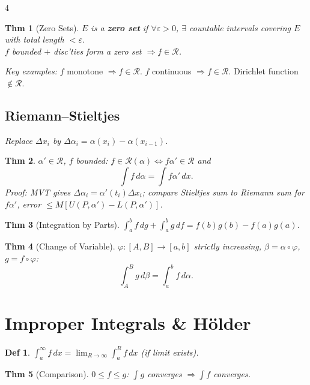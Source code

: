 \documentclass[9pt,landscape]{extarticle}
\newcommand{\eps}{\varepsilon}
\theoremstyle{compact}
\newtheorem*{thm}{Thm}
\newtheorem*{defn}{Def}
\begin{document}
\begin{multicols}{4}
\begin{thm}[Zero Sets]
$E$ is a \textbf{zero set} if $\forall\eps>0$, $\exists$ countable intervals covering $E$ with total length $< \eps$.\\
$f$ bounded $+$ disc'ties form a zero set $\Rightarrow f \in \mathscr{R}$.
\end{thm}

\textit{Key examples:} $f$ monotone $\Rightarrow f \in \mathscr{R}$. $f$ continuous $\Rightarrow f \in \mathscr{R}$. Dirichlet function $\notin \mathscr{R}$.

\subsection{Riemann--Stieltjes}
\textit{Replace $\Delta x_i$ by $\Delta\alpha_i = \alpha(x_i)-\alpha(x_{i-1})$.}

\begin{thm}
$\alpha' \in \mathscr{R}$, $f$ bounded: $f\in\mathscr{R}(\alpha) \Leftrightarrow f\alpha'\in\mathscr{R}$ and
$${\textstyle\int} f\,d\alpha = {\textstyle\int} f\alpha'\,dx.$$
\textit{Proof:} MVT gives $\Delta\alpha_i = \alpha'(t_i)\Delta x_i$; compare Stieltjes sum to Riemann sum for $f\alpha'$, error $\leq M[U(P,\alpha')-L(P,\alpha')]$.
\end{thm}

\begin{thm}[Integration by Parts]
$\displaystyle\int_a^b f\,dg + \int_a^b g\,df = f(b)g(b)-f(a)g(a)$.
\end{thm}

\begin{thm}[Change of Variable]
$\varphi:[A,B]\to[a,b]$ strictly increasing, $\beta = \alpha\circ\varphi$, $g = f\circ\varphi$:
$${\textstyle\int_A^B} g\,d\beta = {\textstyle\int_a^b} f\,d\alpha.$$
\end{thm}

\section{Improper Integrals \& H\"{o}lder}

\begin{defn}
$\int_a^\infty f\,dx = \lim_{R\to\infty}\int_a^R f\,dx$ (if limit exists).
\end{defn}

\begin{thm}[Comparison]
$0 \leq f \leq g$: $\int g$ converges $\Rightarrow \int f$ converges.
\end{thm}


\end{multicols}
\end{document}
